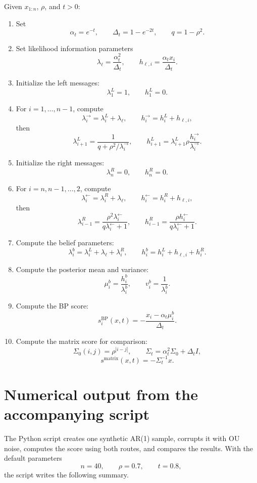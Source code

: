 \documentclass[11pt]{article}
\begin{document}
Given \(x_{1:n}\), \(\rho\), and \(t>0\):
\begin{enumerate}
  \item Set
  \[
    \alpha_t=e^{-t},
    \qquad
    \Delta_t=1-e^{-2t},
    \qquad
    q=1-\rho^2.
  \]
  \item Set likelihood information parameters
  \[
    \lambda_\ell=\frac{\alpha_t^2}{\Delta_t},
    \qquad
    h_{\ell,i}=\frac{\alpha_t x_i}{\Delta_t}.
  \]
  \item Initialize the left messages:
  \[
    \lambda_1^L=1,
    \qquad
    h_1^L=0.
  \]
  \item For \(i=1,\ldots,n-1\), compute
  \[
    \lambda_i^{\to}=\lambda_i^L+\lambda_\ell,
    \qquad
    h_i^{\to}=h_i^L+h_{\ell,i},
  \]
  then
  \[
    \lambda_{i+1}^L=\frac{1}{q+\rho^2/\lambda_i^{\to}},
    \qquad
    h_{i+1}^L=\lambda_{i+1}^L\rho\frac{h_i^{\to}}{\lambda_i^{\to}}.
  \]
  \item Initialize the right messages:
  \[
    \lambda_n^R=0,
    \qquad
    h_n^R=0.
  \]
  \item For \(i=n,n-1,\ldots,2\), compute
  \[
    \lambda_i^{\leftarrow}=\lambda_i^R+\lambda_\ell,
    \qquad
    h_i^{\leftarrow}=h_i^R+h_{\ell,i},
  \]
  then
  \[
    \lambda_{i-1}^R=\frac{\rho^2\lambda_i^{\leftarrow}}{q\lambda_i^{\leftarrow}+1},
    \qquad
    h_{i-1}^R=\frac{\rho h_i^{\leftarrow}}{q\lambda_i^{\leftarrow}+1}.
  \]
  \item Compute the belief parameters:
  \[
    \lambda_i^b=\lambda_i^L+\lambda_\ell+\lambda_i^R,
    \qquad
    h_i^b=h_i^L+h_{\ell,i}+h_i^R.
  \]
  \item Compute the posterior mean and variance:
  \[
    \mu_i^b=\frac{h_i^b}{\lambda_i^b},
    \qquad
    v_i^b=\frac1{\lambda_i^b}.
  \]
  \item Compute the BP score:
  \[
    s_i^{\mathrm{BP}}(x,t)=-\frac{x_i-\alpha_t\mu_i^b}{\Delta_t}.
  \]
  \item Compute the matrix score for comparison:
  \[
    \Sigma_0(i,j)=\rho^{|i-j|},
    \qquad
    \Sigma_t=\alpha_t^2\Sigma_0+\Delta_t I,
  \]
  \[
    s^{\mathrm{matrix}}(x,t)=-\Sigma_t^{-1}x.
  \]
\end{enumerate}

\section{Numerical output from the accompanying script}

The Python script creates one synthetic AR(1) sample, corrupts it with OU noise, computes the score using both routes, and compares the results. With the default parameters
\[
  n=40,
  \qquad
  \rho=0.7,
  \qquad
  t=0.8,
\]
the script writes the following summary.
\end{document}
